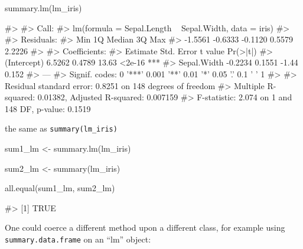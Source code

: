 \begin{Schunk}
\begin{Sinput}
summary.lm(lm_iris)
\end{Sinput}
\begin{Soutput}
#> 
#> Call:
#> lm(formula = Sepal.Length ~ Sepal.Width, data = iris)
#> 
#> Residuals:
#>     Min      1Q  Median      3Q     Max 
#> -1.5561 -0.6333 -0.1120  0.5579  2.2226 
#> 
#> Coefficients:
#>             Estimate Std. Error t value Pr(>|t|)    
#> (Intercept)   6.5262     0.4789   13.63   <2e-16 ***
#> Sepal.Width  -0.2234     0.1551   -1.44    0.152    
#> ---
#> Signif. codes:  0 '***' 0.001 '**' 0.01 '*' 0.05 '.' 0.1 ' ' 1
#> 
#> Residual standard error: 0.8251 on 148 degrees of freedom
#> Multiple R-squared:  0.01382,    Adjusted R-squared:  0.007159 
#> F-statistic: 2.074 on 1 and 148 DF,  p-value: 0.1519
\end{Soutput}
\end{Schunk}

the same as \texttt{summary(lm\_iris)}

\begin{Schunk}
\begin{Sinput}
sum1_lm <- summary.lm(lm_iris)

sum2_lm <- summary(lm_iris)

all.equal(sum1_lm, sum2_lm)
\end{Sinput}
\begin{Soutput}
#> [1] TRUE
\end{Soutput}
\end{Schunk}

One could coerce a different method upon a different class, for example
using \texttt{summary.data.frame} on an ``lm'' object:

